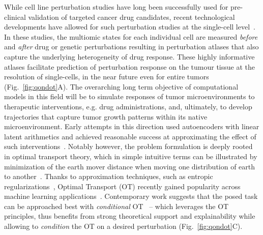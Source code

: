 \documentclass{article}
\begin{document}
While cell line perturbation studies have long been successfully used for pre-clinical validation of targeted cancer drug candidates, recent technological developments have allowed for such perturbation studies at the single-cell level~\cite{srivatsan2020massively}.
In these studies, the multiomic states for each individual cell are measured \textit{before} and \textit{after} drug or genetic perturbations resulting in perturbation atlases that also capture the underlying heterogeneity of drug response. 
These highly informative atlases facilitate prediction of perturbation response on the tumour tissue at the resolution of single-cells, in the near future even for entire tumors (Fig.~\ref{fig:qondot}A). 
The overarching long term objective of computational models in this field will be to simulate responses of tumor microenvironments to therapeutic interventions, e.g. drug administrations, and, ultimately, to develop trajectories that capture tumor growth patterns within its native microenvironment.
Early attempts in this direction used autoencoders with linear latent arithmetics and achieved reasonable success at approximating the effect of such interventions~\cite{lotfollahi2019scgen}. 
Notably however, the problem formulation is deeply rooted in optimal transport theory, which in simple intuitive terms can be illustrated by minimization of the earth mover distance when moving one distribution of earth to another~\cite{villani2009optimal}.
Thanks to approximation techniques, such as entropic regularizations~\cite{cuturi2013sinkhorn}, Optimal Transport (OT) recently gained popularity across machine learning applications~\cite{peyre2019computational}.
Contemporary work suggests that the posed task can be approached best with \textit{conditional} OT~\cite{bunne2022supervised} -- which leverages the OT principles, thus benefits from strong theoretical support and explainability while allowing to \textit{condition} the OT on a desired perturbation (Fig.~\ref{fig:qondot}C).
\end{document}
